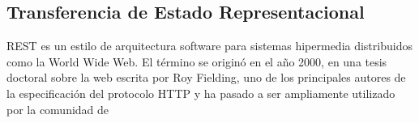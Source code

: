 \subsection{Transferencia de Estado Representacional}

 REST es un estilo de arquitectura software para sistemas hipermedia distribuidos como la World Wide Web. El término se originó en el año 2000, en una tesis doctoral sobre la web escrita por Roy Fielding, uno de los principales autores de la especificación del protocolo HTTP y ha pasado a ser ampliamente utilizado por la comunidad de 
